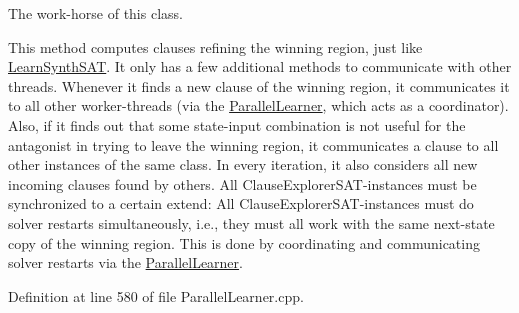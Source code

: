 The work-\/horse of this class. 

This method computes clauses refining the winning region, just like \hyperlink{classLearnSynthSAT}{Learn\-Synth\-S\-A\-T}. It only has a few additional methods to communicate with other threads. Whenever it finds a new clause of the winning region, it communicates it to all other worker-\/threads (via the \hyperlink{classParallelLearner}{Parallel\-Learner}, which acts as a coordinator). Also, if it finds out that some state-\/input combination is not useful for the antagonist in trying to leave the winning region, it communicates a clause to all other instances of the same class. In every iteration, it also considers all new incoming clauses found by others. All Clause\-Explorer\-S\-A\-T-\/instances must be synchronized to a certain extend\-: All Clause\-Explorer\-S\-A\-T-\/instances must do solver restarts simultaneously, i.\-e., they must all work with the same next-\/state copy of the winning region. This is done by coordinating and communicating solver restarts via the \hyperlink{classParallelLearner}{Parallel\-Learner}. 

Definition at line 580 of file Parallel\-Learner.\-cpp.



